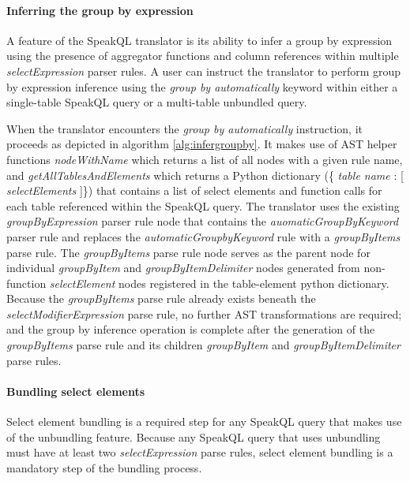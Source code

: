 \TransformUnbundledQuery


\paragraph{Inferring the group by expression}

A feature of the SpeakQL translator is its ability to infer a group by expression using the presence of aggregator functions and column references within multiple \emph{selectExpression} parser rules. A user can instruct the translator to perform group by expression inference using the \emph{group by automatically} keyword within either a single-table SpeakQL query or a multi-table unbundled query.

\TransformFunctionInferGroupBy

When the translator encounters the \emph{group by automatically} instruction, it proceeds as depicted in algorithm \ref{alg:infergroupby}. It makes use of AST helper functions \emph{nodeWithName} which returns a list of all nodes with a given rule name, and \emph{getAllTablesAndElements} which returns a Python dictionary (\{ \emph{table name} : [ \emph{selectElements} ]\}) that contains a list of select elements and function calls for each table referenced within the SpeakQL query. The translator uses the existing \emph{groupByExpression} parser rule node that contains the \emph{auomaticGroupByKeyword} parser rule and replaces the \emph{automaticGroupbyKeyword} rule with a \emph{groupByItems} parse rule. The \emph{groupByItems} parse rule node serves as the parent node for individual \emph{groupByItem} and \emph{groupByItemDelimiter} nodes generated from non-function \emph{selectElement} nodes registered in the table-element python dictionary. Because the \emph{groupByItems} parse rule already exists beneath the \emph{selectModifierExpression} parse rule, no further AST transformations are required; and the group by inference operation is complete after the generation of the \emph{groupByItems} parse rule and its children \emph{groupByItem} and \emph{groupByItemDelimiter} parse rules.

\paragraph{Bundling select elements}

Select element bundling is a required step for any SpeakQL query that makes use of the unbundling feature. Because any SpeakQL query that uses unbundling must have at least two \emph{selectExpression} parse rules, select element bundling is a mandatory step of the bundling process.

